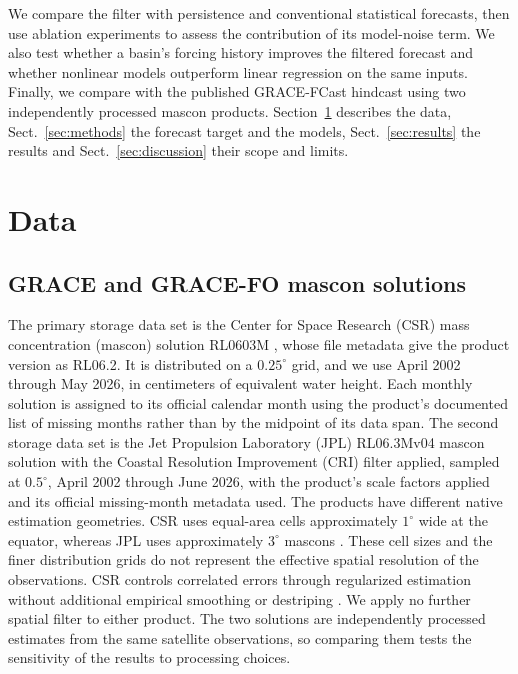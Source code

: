 \documentclass[hess, manuscript]{copernicus}
\begin{document}
We compare the filter with persistence and conventional statistical
forecasts, then use ablation experiments to assess the contribution of
its model-noise term. We also test whether a basin's forcing history
improves the filtered forecast and whether nonlinear models outperform
linear regression on the same inputs. Finally, we compare with the
published GRACE-FCast hindcast \citep{li2026fcast} using two independently
processed mascon products. Section~\ref{sec:data} describes the data,
Sect.~\ref{sec:methods} the forecast target and the models,
Sect.~\ref{sec:results} the results and Sect.~\ref{sec:discussion} their
scope and limits.

\section{Data}
\label{sec:data}

\subsection{GRACE and GRACE-FO mascon solutions}
\label{sec:data-grace}

The primary storage data set is the Center for Space Research (CSR) mass
concentration (mascon) solution RL0603M \citep{save2016mascons,
save2020rl06}, whose file metadata give the product version as RL06.2. It
is distributed on a $0.25^{\circ}$ grid, and we use April 2002 through May
2026, in centimeters of equivalent water height.
Each monthly solution is assigned to its official calendar month using the
product's documented list of missing months rather than by the midpoint of
its data span.
The second storage data set is the Jet Propulsion Laboratory (JPL) RL06.3Mv04 mascon solution
\citep{watkins2015mascons, wiese2023jpl} with the Coastal Resolution
Improvement (CRI) filter \citep{wiese2016cri} applied, sampled at $0.5^{\circ}$,
April 2002 through June 2026, with the product's scale factors applied and
its official missing-month metadata used.
The products have different native estimation geometries. CSR uses
equal-area cells approximately $1^{\circ}$ wide at the equator, whereas
JPL uses approximately $3^{\circ}$ mascons
\citep{csr2026documentation, wiese2023jpl}. These cell sizes and the finer
distribution grids do not represent the effective spatial resolution of
the observations. CSR controls correlated errors through regularized
estimation without additional empirical smoothing or destriping
\citep{csr2026documentation}. We apply no further spatial filter to either
product. The two solutions are independently processed estimates from the
same satellite observations, so comparing them tests the sensitivity of
the results to processing choices.
\end{document}
